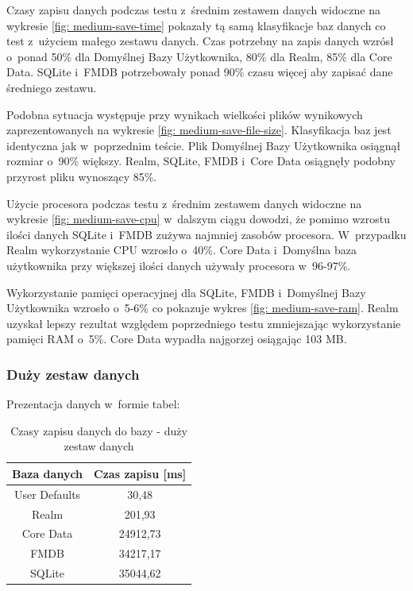 \newpage

Czasy zapisu danych podczas testu z~średnim zestawem danych  widoczne na wykresie \ref{fig: medium-save-time} pokazały tą samą klasyfikacje baz danych co test z~użyciem małego zestawu danych. Czas potrzebny na zapis danych wzrósł o~ponad 50\% dla Domyślnej Bazy Użytkownika, 80\% dla Realm, 85\% dla Core Data. SQLite i~FMDB potrzebowały ponad 90\% czasu więcej aby zapisać dane średniego zestawu. \par

Podobna sytuacja występuje przy wynikach wielkości plików wynikowych zaprezentowanych na wykresie \ref{fig: medium-save-file-size}. Klasyfikacja baz jest identyczna jak w~poprzednim teście. Plik Domyślnej Bazy Użytkownika osiągnął rozmiar o~90\% większy. Realm, SQLite, FMDB i~Core Data osiągnęły podobny przyrost pliku wynoszący 85\%. \par 

Użycie procesora podczas testu z~średnim zestawem danych widoczne na wykresie \ref{fig: medium-save-cpu} w~dalszym ciągu dowodzi, że pomimo wzrostu ilości danych SQLite i~FMDB zużywa najmniej zasobów procesora. W~przypadku Realm wykorzystanie CPU wzrosło o~40\%. Core Data i~Domyślna baza użytkownika przy większej ilości danych używały procesora w~96-97\%. \par 

Wykorzystanie pamięci operacyjnej dla SQLite, FMDB i~Domyślnej Bazy Użytkownika wzrosło o~5-6\% co pokazuje wykres \ref{fig: medium-save-ram}. Realm uzyskał lepszy rezultat względem poprzedniego testu zmniejszając wykorzystanie pamięci RAM o~5\%. Core Data wypadła najgorzej osiągając 103 MB. \par


\subsubsection{Duży zestaw danych}

Prezentacja danych w~formie tabel: 

\begin{table}[h]
\centering
\caption{Czasy zapisu danych do bazy - duży zestaw danych}
\label{tab: big-save-time-table}
\begin{tabular}{|c|c|}
\hline
Baza danych   & Czas zapisu [ms] \\ \hline
User Defaults & 30,48            \\ \hline
Realm         & 201,93           \\ \hline
Core Data     & 24912,73         \\ \hline
FMDB          & 34217,17         \\ \hline
SQLite        & 35044,62         \\ \hline
\end{tabular}
\end{table}

